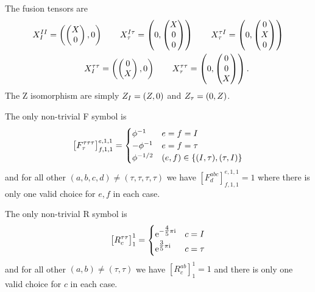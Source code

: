 The fusion tensors are
\begin{gather}
\begin{gathered}
    X^{II}_I = \fermpair{\begin{pmatrix} X \\ 0\end{pmatrix}}{0}
    \qquad X^{I\tau}_\tau = \fermpair{0}{\begin{pmatrix} X \\ 0 \\ 0\end{pmatrix}}
    \qquad X^{\tau I}_\tau = \fermpair{0}{\begin{pmatrix} 0 \\ X \\ 0\end{pmatrix}}
    \\
    \qquad X^{\tau\tau}_I = \fermpair{\begin{pmatrix} 0 \\ X\end{pmatrix}}{0}
    \qquad X^{\tau\tau}_\tau = \fermpair{0}{\begin{pmatrix} 0 \\ 0 \\ X\end{pmatrix}}
    .
\end{gathered}
\end{gather}
The Z isomorphism are simply $Z_I = \fermpair{Z}{0}$ and $Z_\tau = \fermpair{0}{Z}$.

The only non-trivial F symbol is
\begin{equation}
    \big[ F^{\tau\tau\tau}_{\tau} \big]^{e,1,1}_{f,1,1}
    = \begin{cases}
        \phi^{-1} & e = f = I \\
        -\phi^{-1} & e = f = \tau \\
        \phi^{-1/2} & (e, f) \in \set{(I, \tau), (\tau, I)}
    \end{cases}
\end{equation}
and for all other $(a,b,c,d) \neq (\tau,\tau,\tau,\tau)$ we have $[F^{abc}_{d}]^{e,1,1}_{f,1,1} = 1$ where there is only one valid choice for $e,f$ in each case.

The only non-trivial R symbol is
\begin{equation}
    \big[R^{\tau\tau}_{c}\big]^1_1
    = \begin{cases}
        \mathrm{e}^{-\tfrac{4}{5}\pi\mathrm{i} } & c = I \\
        \mathrm{e}^{\tfrac{3}{5}\pi\mathrm{i} } & c = \tau
    \end{cases}
\end{equation}
and for all other $(a,b) \neq (\tau,\tau)$ we have $[R^{ab}_c]^1_1 = 1$ and there is only one valid choice for $c$ in each case.

